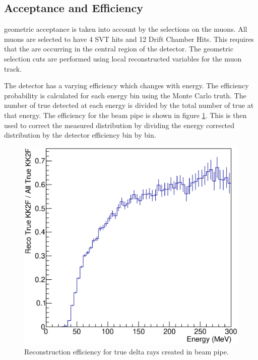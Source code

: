 \subsection{Acceptance and Efficiency}
	\babar geometric acceptance is taken into account by the selections on the muons. All muons are selected to have 4 SVT hits and 12 Drift Chamber Hits. This requires that the \deltarays are occurring in the central region of the detector. The geometric selection cuts are performed using local reconstructed variables for the muon track.
	
	The \babar detector has a varying efficiency which changes with energy. The efficiency probability is calculated for each energy bin using the Monte Carlo truth. The number of true detected \deltarays at each energy is divided by the total number of true \deltarays at that energy. The efficiency for the beam pipe is shown in figure 
	\ref{fig:BPeff}. This is then used to correct the measured distribution by dividing the energy corrected \deltaray distribution by the detector efficiency bin by bin.
	\begin{figure}[htb]
		\centering
		\includegraphics[scale=0.5]{figures/Efficiency.eps}
		\caption{Reconstruction efficiency for true delta rays created in beam pipe.}
		\label{fig:BPeff}
	\end{figure}

